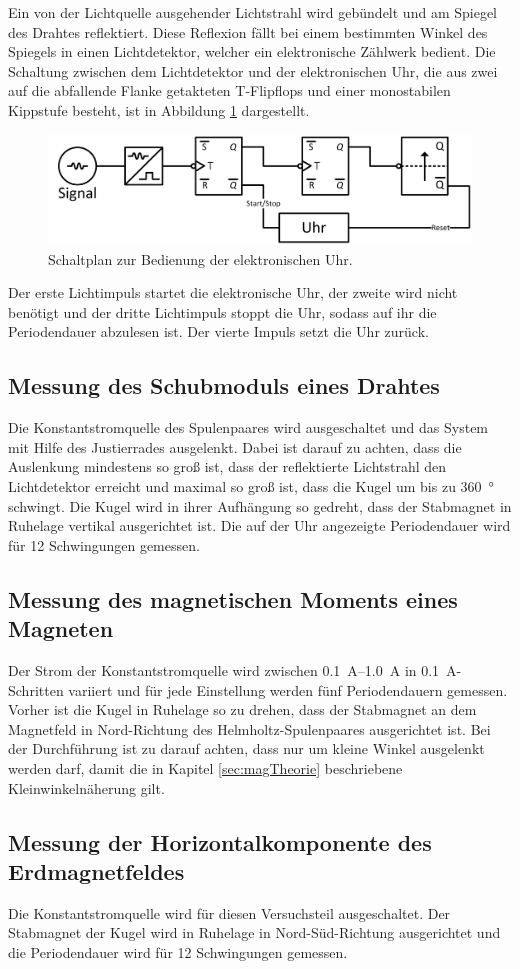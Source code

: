 Ein von der Lichtquelle ausgehender Lichtstrahl wird gebündelt und am Spiegel
des Drahtes reflektiert. Diese Reflexion fällt bei einem bestimmten Winkel des
Spiegels in einen Lichtdetektor, welcher ein elektronische Zählwerk bedient. Die
Schaltung zwischen dem Lichtdetektor und der elektronischen Uhr, die aus zwei
auf die abfallende Flanke getakteten T-Flipflops und einer monostabilen Kippstufe besteht,
ist in Abbildung \ref{fig:Versuchsaufbau3} dargestellt.

\begin{figure}
  \centering
  \includegraphics[width=\textwidth]{content/Schaltplan.jpg}
  \caption{Schaltplan zur Bedienung der elektronischen Uhr.}
  \label{fig:Versuchsaufbau3}
\end{figure}

Der erste Lichtimpuls startet die elektronische Uhr, der zweite wird nicht
benötigt und der dritte Lichtimpuls stoppt die Uhr, sodass auf ihr die
Periodendauer abzulesen ist. Der vierte Impuls setzt die Uhr zurück.

\subsection{Messung des Schubmoduls eines Drahtes}
\label{sec:elKonstanten}

Die Konstantstromquelle des Spulenpaares wird ausgeschaltet und das System mit
Hilfe des Justierrades ausgelenkt. Dabei ist darauf zu achten, dass die Auslenkung
mindestens so groß ist, dass der reflektierte Lichtstrahl den Lichtdetektor
erreicht und maximal so groß ist, dass die Kugel um bis zu \SI{360}{\degree}
schwingt. Die Kugel
wird in ihrer Aufhängung so gedreht, dass der Stabmagnet in Ruhelage
vertikal ausgerichtet ist.
Die auf der Uhr angezeigte Periodendauer wird für 12 Schwingungen gemessen.

\subsection{Messung des magnetischen Moments eines Magneten}
\label{sec:magMoment}

Der Strom der Konstantstromquelle wird zwischen
\SIrange[range-phrase = \:und\:]{0.1}{1.0}{\ampere} in
\SI{0.1}{\ampere}-Schritten variiert und für jede Einstellung werden fünf
Periodendauern gemessen. Vorher ist die Kugel in Ruhelage so zu drehen, dass der Stabmagnet
an dem Magnetfeld in Nord-Richtung des Helmholtz-Spulenpaares ausgerichtet ist.
Bei der Durchführung ist zu darauf achten, dass nur um kleine Winkel ausgelenkt werden
darf, damit die in Kapitel \ref{sec:magTheorie} beschriebene Kleinwinkelnäherung gilt.

\subsection{Messung der Horizontalkomponente des Erdmagnetfeldes}
\label{sec:Erdmagnetfeld}

Die Konstantstromquelle wird für diesen Versuchsteil ausgeschaltet.
Der Stabmagnet der Kugel wird in Ruhelage in Nord-Süd-Richtung ausgerichtet und
die Periodendauer wird für 12 Schwingungen gemessen.
